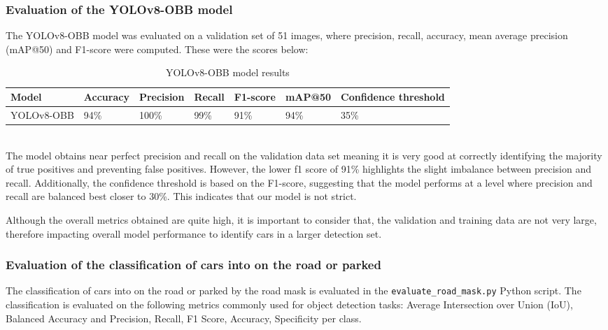 \subsubsection{Evaluation of the YOLOv8-OBB model}
The YOLOv8-OBB model was evaluated on a validation set of 51 images, where precision, recall, accuracy, mean average precision (mAP@50) and F1-score were computed. These were the scores below:
\begin{table}[htbp]
  \centering
  \begin{tabular}{|p{}|p{}|p{}|p{}|p{}|p{}|p{}|}
    \hline
    \textbf{Model} & \textbf{Accuracy} & \textbf{Precision} & \textbf{Recall} & \textbf{F1-score} & \textbf{mAP@50} & \textbf{Confidence threshold} \\
    \hline
    YOLOv8-OBB     & 94\%              & 100\%              & 99\%            & 91\%              & 94\%            & 35\%                          \\
    \hline
  \end{tabular}
  \caption{YOLOv8-OBB model results}
\end{table}\\

The model obtains near perfect precision and recall on the validation data set meaning it is very good at correctly identifying the majority of true positives and preventing false positives.
However, the lower f1 score of 91\% highlights the slight imbalance between precision and recall. Additionally, the confidence threshold is based on the F1-score, suggesting that the model performs at a level where precision and recall are balanced best closer to 30\%. This indicates that our model is not strict.

Although the overall metrics obtained are quite high, it is important to consider that, the validation and training data are not very large, therefore impacting overall model performance to identify cars in a larger detection set.

\subsubsection{Evaluation of the classification of cars into on the road or parked}
The classification of cars into on the road or parked by the road mask is evaluated in the \texttt{evaluate\_road\_mask.py} Python script.
The classification is evaluated on the following metrics commonly used for object detection tasks: Average Intersection over Union (IoU), Balanced Accuracy and Precision, Recall, F1 Score, Accuracy, Specificity per class.

